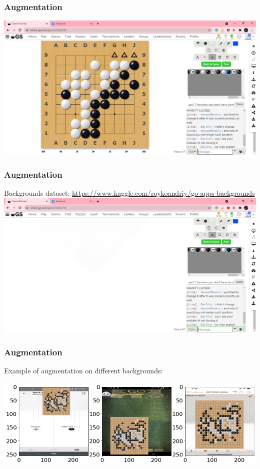 \documentclass{beamer}
\begin{document}

\begin{frame}
\frametitle{Augmentation}

\includegraphics[width=\textwidth]{images/background_example.png}


\end{frame}


\begin{frame}
\frametitle{Augmentation}
Backgrounds dataset: \url{https://www.kaggle.com/roykoandriy/go-apps-backgrounds}
\includegraphics[width=\textwidth]{images/background_example2.png}


\end{frame}


\begin{frame}
\frametitle{Augmentation}
Example of augmentation on different backgrounds:
\begin{center}
\includegraphics[scale=0.35]{images/augmentation.png}
\end{center}

\end{frame}
\end{document}
